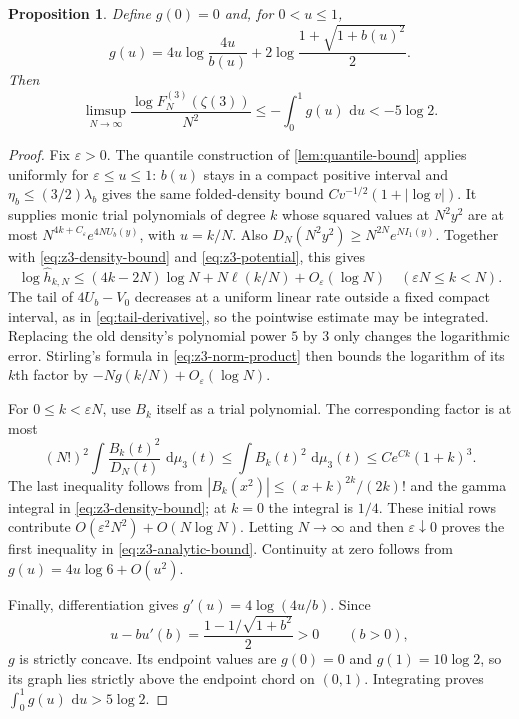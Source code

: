 \documentclass[11pt,letterpaper]{article}
\newtheorem{proposition}[proposition]{Proposition}
\theoremstyle{definition}
\newcommand{\dd}{\,\mathrm d}
\begin{document}
\begin{proposition}\label{prop:z3-analytic}
Define $g(0)=0$ and, for $0<u\le1$,
\begin{equation}\label{eq:z3-g}
 g(u)=4u\log\frac{4u}{b(u)}
       +2\log\frac{1+\sqrt{1+b(u)^2}}2.
\end{equation}
Then
\begin{equation}\label{eq:z3-analytic-bound}
 \limsup_{N\to\infty}\frac{\log F_N^{(3)}(\zeta(3))}{N^2}
 \le-\int_0^1g(u)\,\dd u<-5\log2.
\end{equation}
\end{proposition}
\begin{proof}
Fix $\varepsilon>0$. The quantile construction of
\cref{lem:quantile-bound} applies uniformly for $\varepsilon\le u\le1$:
$b(u)$ stays in a compact positive interval and
$\eta_b\le(3/2)\lambda_b$ gives the same folded-density bound
$Cv^{-1/2}(1+|\log v|)$. It supplies monic trial polynomials of degree
$k$ whose squared values at $N^2y^2$ are at most
$N^{4k+C_\varepsilon}e^{4NU_b(y)}$, with $u=k/N$.
Also $D_N(N^2y^2)\ge N^{2N}e^{NI_1(y)}$.
Together with \eqref{eq:z3-density-bound} and
\eqref{eq:z3-potential}, this gives
\[
 \log\widehat h_{k,N}
 \le(4k-2N)\log N+N\ell(k/N)+O_\varepsilon(\log N)
 \quad(\varepsilon N\le k<N).
\]
The tail of $4U_b-V_0$ decreases at a uniform linear rate outside a
fixed compact interval, as in \eqref{eq:tail-derivative}, so the
pointwise estimate may be integrated. Replacing the old density's
polynomial power $5$ by $3$ only changes the logarithmic error.
Stirling's formula in \eqref{eq:z3-norm-product} then bounds the
logarithm of its $k$th factor by $-Ng(k/N)+O_\varepsilon(\log N)$.

For $0\le k<\varepsilon N$, use $B_k$ itself as a trial polynomial.
The corresponding factor is at most
\[
 (N!)^2\int\frac{B_k(t)^2}{D_N(t)}\,\dd\mu_3(t)
 \le\int B_k(t)^2\,\dd\mu_3(t)
 \le Ce^{Ck}(1+k)^3.
\]
The last inequality follows from
$|B_k(x^2)|\le(x+k)^{2k}/(2k)!$ and the gamma integral in
\eqref{eq:z3-density-bound}; at $k=0$ the integral is $1/4$.
These initial rows contribute $O(\varepsilon^2N^2)+O(N\log N)$.
Letting $N\to\infty$ and then $\varepsilon\downarrow0$ proves the
first inequality in \eqref{eq:z3-analytic-bound}. Continuity at zero
follows from $g(u)=4u\log6+O(u^2)$.

Finally, differentiation gives $g'(u)=4\log(4u/b)$. Since
\[
 u-bu'(b)=\frac{1-1/\sqrt{1+b^2}}2>0\qquad(b>0),
\]
$g$ is strictly concave. Its endpoint values are
$g(0)=0$ and $g(1)=10\log2$, so its graph lies strictly above the
endpoint chord on $(0,1)$. Integrating proves
$\int_0^1g(u)\,\dd u>5\log2$.
\end{proof}
\end{document}
